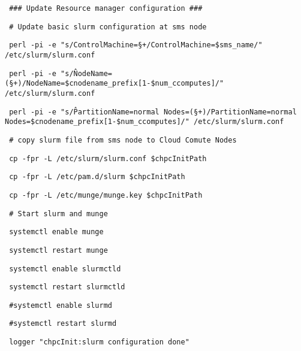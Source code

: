 \documentclass[12pt]{article}
\begin{document}
\begin{bash}\texttt{\small{ \#\#\# Update Resource manager configuration \#\#\#}}\end{bash}
\begin{bash}\texttt{\small{ \# Update basic slurm configuration at sms node}}\end{bash}
\begin{bash}\texttt{\small{ perl -pi -e "s/ControlMachine=\S+/ControlMachine=\${sms\_name}/" /etc/slurm/slurm.conf}}\end{bash}
\begin{bash}\texttt{\small{ perl -pi -e "s/\^NodeName=(\S+)/NodeName=\${cnodename\_prefix}[1-\${num\_ccomputes}]/" /etc/slurm/slurm.conf}}\end{bash}
\begin{bash}\texttt{\small{ perl -pi -e "s/\^PartitionName=normal Nodes=(\S+)/PartitionName=normal Nodes=\${cnodename\_prefix}[1-\${num\_ccomputes}]/" /etc/slurm/slurm.conf}}\end{bash}
\begin{bash}\texttt{\small{ \# copy slurm file from sms node to Cloud Comute Nodes}}\end{bash}
\begin{bash}\texttt{\small{ cp -fpr -L /etc/slurm/slurm.conf \$chpcInitPath}}\end{bash}
\begin{bash}\texttt{\small{ cp -fpr -L /etc/pam.d/slurm \$chpcInitPath}}\end{bash}
\begin{bash}\texttt{\small{ cp -fpr -L /etc/munge/munge.key \$chpcInitPath}}\end{bash}
\begin{bash}\texttt{\small{ \# Start slurm and munge }}\end{bash}
\begin{bash}\texttt{\small{ systemctl enable munge}}\end{bash}
\begin{bash}\texttt{\small{ systemctl restart munge}}\end{bash}
\begin{bash}\texttt{\small{ systemctl enable slurmctld}}\end{bash}
\begin{bash}\texttt{\small{ systemctl restart slurmctld}}\end{bash}
\begin{bash}\texttt{\small{ \#systemctl enable slurmd}}\end{bash}
\begin{bash}\texttt{\small{ \#systemctl restart slurmd}}\end{bash}
\begin{bash}\texttt{\small{ logger "chpcInit:slurm configuration done"}}\end{bash}
\end{document}
